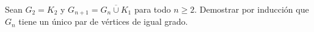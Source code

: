 
\item Sean $G_2 = K_2$ y $G_{n+1} = \overline{G_n \cup K_1}$ para todo $n \geq 2$.
Demostrar por inducción que $G_n$ tiene un único par de vértices de igual grado.



